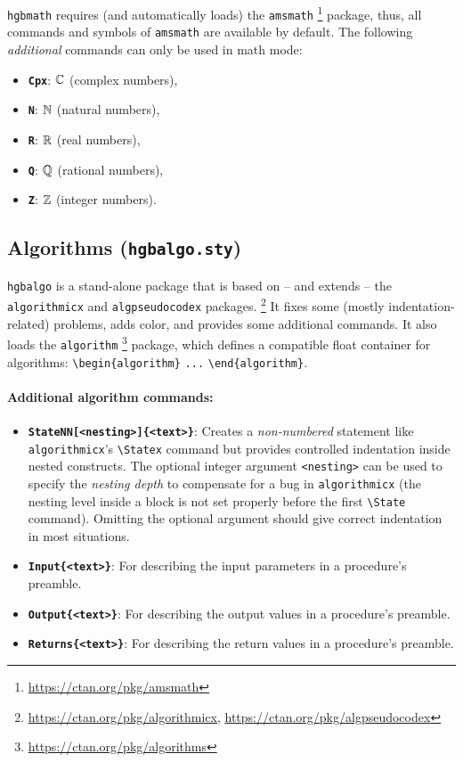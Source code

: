 \documentclass[english]{hgbarticle}
\begin{document}
\texttt{hgbmath} requires (and automatically loads) the \texttt{amsmath}%
\footnote{\url{https://ctan.org/pkg/amsmath}}
package, thus, all commands and symbols of \texttt{amsmath} are available by
default. The following \emph{additional} commands can only be used in math mode:
%
\begin{itemize}
    \item \textbf{\texttt{{\bs}Cpx}}: $\Cpx$ (complex numbers),
    \item \textbf{\texttt{{\bs}N}}: $\N$ (natural numbers),
    \item \textbf{\texttt{{\bs}R}}: $\R$ (real numbers),
    \item \textbf{\texttt{{\bs}Q}}: $\Q$ (rational numbers),
    \item \textbf{\texttt{{\bs}Z}}: $\Z$ (integer numbers).
\end{itemize}


\subsection{Algorithms (\texttt{hgbalgo.sty})}

\texttt{hgbalgo} is a stand-alone package that is based on -- and extends --
the \texttt{algorithmicx} and \texttt{algpseudocodex} packages.%
\footnote{\url{https://ctan.org/pkg/algorithmicx},
    \url{https://ctan.org/pkg/algpseudocodex}}
It fixes some (mostly indentation-related) problems, adds color, and provides
some additional commands. It also loads the \texttt{algorithm}%
\footnote{\url{https://ctan.org/pkg/algorithms}}
package, which defines a compatible float container for algorithms:
\verb!\begin{algorithm}! \verb!...! \verb!\end{algorithm}!.

\paragraph{Additional algorithm commands:}
\begin{itemize}
    \item
    \textbf{\texttt{{\bs}StateNN[<nesting>]\{<text>\}}}:
    Creates a \emph{non-numbered} statement like \texttt{algo\-rith\-micx}'s
    \verb!\Statex! command but provides controlled indentation inside nested
    constructs. The optional integer argument \verb!<nesting>! can be used to
    specify the \emph{nesting depth} to compensate for a bug in
    \texttt{algorithmicx} (the nesting level inside a block is not set
    properly before the first \verb!\State! command). Omitting the optional
    argument should give correct indentation in most situations.
    \item
    \textbf{\texttt{{\bs}Input\{<text>\}}}:
    For describing the input parameters in a procedure's preamble.
    \item
    \textbf{\texttt{{\bs}Output\{<text>\}}}:
    For describing the output values in a procedure's preamble.
    \item
    \textbf{\texttt{{\bs}Returns\{<text>\}}}:
    For describing the return values in a procedure's preamble.
\end{itemize}
\end{document}

